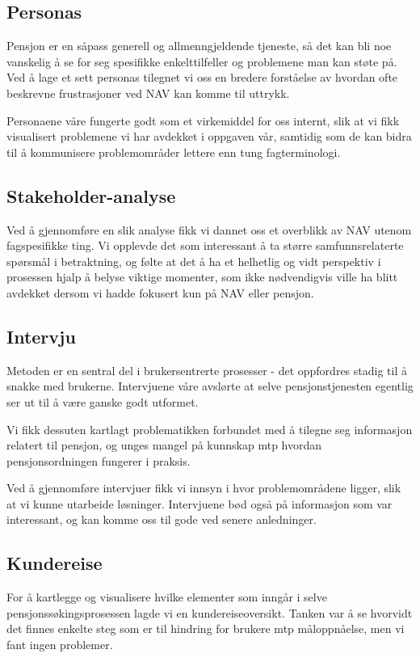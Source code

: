 \documentclass[informationsecurity]{gucmasterproject}
\begin{document}
\subsection{Personas}
Pensjon er en såpass generell og allmenngjeldende tjeneste, så det kan bli noe vanskelig å se for seg spesifikke enkelttilfeller og problemene man kan støte på. Ved å lage et sett personas tilegnet vi oss en bredere forståelse av hvordan ofte beskrevne frustrasjoner ved NAV kan komme til uttrykk.

Personaene våre fungerte godt som et virkemiddel for oss internt, slik at vi fikk visualisert problemene vi har avdekket i oppgaven vår, samtidig som de kan bidra til å kommunisere problemområder lettere enn tung fagterminologi.

\subsection{Stakeholder-analyse}
Ved å gjennomføre en slik analyse fikk vi dannet oss et overblikk av NAV utenom fagspesifikke ting. Vi opplevde det som interessant å ta større samfunnsrelaterte spørsmål i betraktning, og følte at det å ha et helhetlig og vidt perspektiv i prosessen hjalp å belyse viktige momenter, som ikke nødvendigvis ville ha blitt avdekket dersom vi hadde fokusert kun på NAV eller pensjon.

\subsection{Intervju}
Metoden er en sentral del i brukersentrerte prosesser - det oppfordres stadig til å snakke med brukerne. Intervjuene våre avslørte at selve pensjonstjenesten egentlig ser ut til å være ganske godt utformet.

Vi fikk dessuten kartlagt problematikken forbundet med å tilegne seg informasjon relatert til pensjon, og unges mangel på kunnskap mtp hvordan pensjonsordningen fungerer i praksis.

Ved å gjennomføre intervjuer fikk vi innsyn i hvor problemområdene ligger, slik at vi kunne utarbeide løsninger. Intervjuene bød også på informasjon som var interessant, og kan komme oss til gode ved senere anledninger.

\subsection{Kundereise}
For å kartlegge og visualisere hvilke elementer som inngår i selve pensjonssøkingsprosessen lagde vi en kundereiseoversikt. Tanken var å se hvorvidt det finnes enkelte steg som er til hindring for brukere mtp måloppnåelse, men vi fant ingen problemer.
\end{document}
